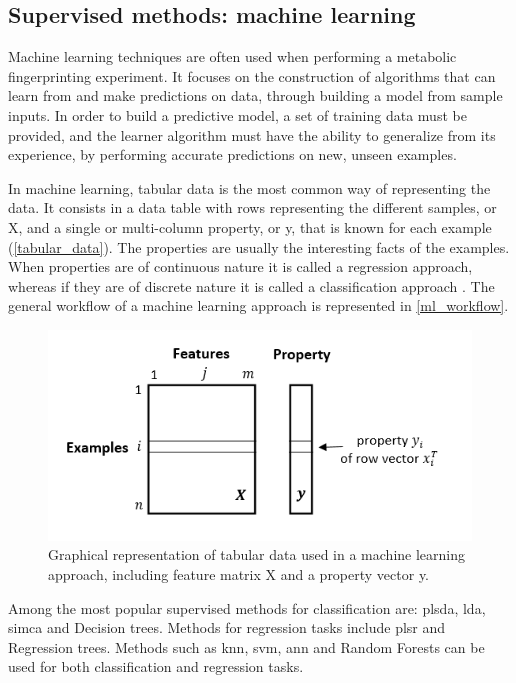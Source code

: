 
\subsection{Supervised methods: machine learning} \label{supervised}

Machine learning techniques are often used when performing a metabolic fingerprinting experiment. It focuses on the construction of algorithms that can learn from and make predictions on data, through building a model from sample inputs. In order to build a predictive model, a set of training data must be provided, and the learner algorithm must have the ability to generalize from its experience, by performing accurate predictions on new, unseen examples. 

In machine learning, tabular data is the most common way of representing the data. It consists in a data table with rows representing the different samples, or X, and a single or multi-column property, or y, that is known for each example (\autoref{tabular_data}). The properties are usually the interesting facts of the examples. When properties are of continuous nature it is called a regression approach, whereas if they are of discrete nature it is called a classification approach \citep{varmuza2009introduction}. The general workflow of a machine learning approach is represented in \autoref{ml_workflow}.

\begin{figure}[!htb]
	\centering
	\includegraphics[width=0.6\linewidth]{Imagens/tabular_data}
	\caption{Graphical representation of tabular data used in a machine learning approach, including feature matrix X and a property vector y.}
	\label{tabular_data}
\end{figure}



Among the most popular supervised methods for classification are: \acrfull{plsda}, \acrfull{lda}, \acrfull{simca} and Decision trees. Methods for regression tasks include \acrfull{plsr} and Regression trees. Methods such as \acrfull{knn}, \acrfull{svm}, \acrfull{ann} and Random Forests can be used for both classification and regression tasks.

